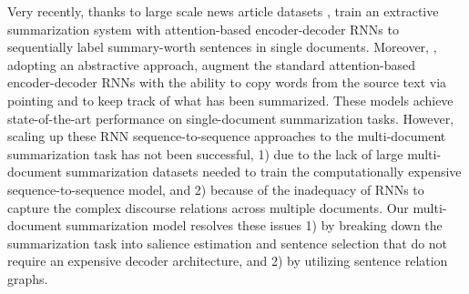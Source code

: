 \documentclass[11pt,a4paper]{article}
\begin{document}
Very recently, thanks to large scale news article datasets \cite{hermann2015teaching},  train an extractive summarization system with attention-based encoder-decoder RNNs to sequentially label summary-worth sentences in single documents.
Moreover, , adopting an abstractive approach, augment the standard attention-based encoder-decoder RNNs with the ability to copy words from the source text via pointing and to keep track of what has been summarized.
These models \cite{cheng2016neural,see2017get} achieve state-of-the-art performance on single-document summarization tasks.
However, scaling up these RNN sequence-to-sequence approaches to the multi-document summarization task has not been successful, 1) due to the lack of large multi-document summarization datasets needed to train the computationally expensive sequence-to-sequence model, and 2) because of the inadequacy of RNNs to capture the complex discourse relations across multiple documents.
Our multi-document summarization model resolves these issues 1) by 
breaking down the summarization task into salience estimation and sentence selection that do not require an expensive decoder architecture,
and 2) by utilizing sentence relation graphs.






 
\end{document}
